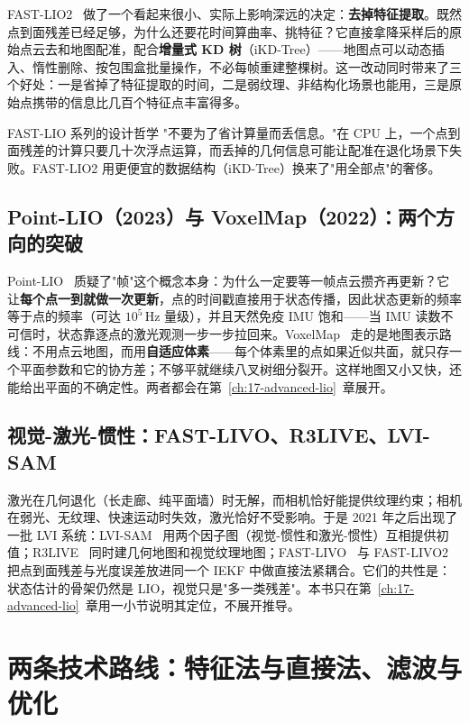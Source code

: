 FAST-LIO2~\cite{xu2022fastlio2} 做了一个看起来很小、实际上影响深远的决定：\textbf{去掉特征提取}。既然点到面残差已经足够，为什么还要花时间算曲率、挑特征？它直接拿降采样后的原始点云去和地图配准，配合\textbf{增量式 KD 树}（iKD-Tree）——地图点可以动态插入、惰性删除、按包围盒批量操作，不必每帧重建整棵树。这一改动同时带来了三个好处：一是省掉了特征提取的时间，二是弱纹理、非结构化场景也能用，三是原始点携带的信息比几百个特征点丰富得多。

\begin{keybox}{FAST-LIO 系列的设计哲学}
"不要为了省计算量而丢信息。"在 CPU 上，一个点到面残差的计算只要几十次浮点运算，而丢掉的几何信息可能让配准在退化场景下失败。FAST-LIO2 用更便宜的数据结构（iKD-Tree）换来了"用全部点"的奢侈。
\end{keybox}

\subsection{Point-LIO（2023）与 VoxelMap（2022）：两个方向的突破}

Point-LIO~\cite{he2023pointlio} 质疑了"帧"这个概念本身：为什么一定要等一帧点云攒齐再更新？它让\textbf{每个点一到就做一次更新}，点的时间戳直接用于状态传播，因此状态更新的频率等于点的频率（可达 $10^5$\,Hz 量级），并且天然免疫 IMU 饱和——当 IMU 读数不可信时，状态靠逐点的激光观测一步一步拉回来。VoxelMap~\cite{yuan2022voxelmap} 走的是地图表示路线：不用点云地图，而用\textbf{自适应体素}——每个体素里的点如果近似共面，就只存一个平面参数和它的协方差；不够平就继续八叉树细分裂开。这样地图又小又快，还能给出平面的不确定性。两者都会在第~\ref{ch:17-advanced-lio}~章展开。

\subsection{视觉-激光-惯性：FAST-LIVO、R3LIVE、LVI-SAM}

激光在几何退化（长走廊、纯平面墙）时无解，而相机恰好能提供纹理约束；相机在弱光、无纹理、快速运动时失效，激光恰好不受影响。于是 2021 年之后出现了一批 LVI 系统：LVI-SAM~\cite{shan2021lvisam} 用两个因子图（视觉-惯性和激光-惯性）互相提供初值；R3LIVE~\cite{lin2022r3live} 同时建几何地图和视觉纹理地图；FAST-LIVO~\cite{yuan2022fastlivo} 与 FAST-LIVO2~\cite{yuan2024fastlivo2} 把点到面残差与光度误差放进同一个 IEKF 中做直接法紧耦合。它们的共性是：状态估计的骨架仍然是 LIO，视觉只是"多一类残差"。本书只在第~\ref{ch:17-advanced-lio}~章用一小节说明其定位，不展开推导。

\section{两条技术路线：特征法与直接法、滤波与优化}\label{sec:16-routes}

